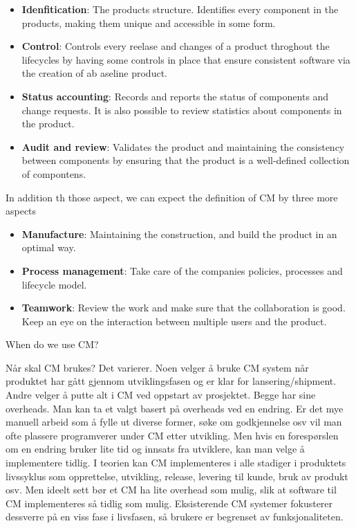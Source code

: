 \begin{itemize}

	\item \textbf{Idenfitication}: The products structure. Identifies every component in the products, making them unique and accessible in some form.
	\item \textbf{Control}: Controls every reelase and changes of a product throghout the lifecycles by having some controls in place that ensure consistent software via the creation of ab aseline product.
	\item \textbf{Status accounting}: Records and reports the status of components and change requests. It is also possible to review statistics about components in the product.
	\item \textbf{Audit and review}: Validates the product and maintaining the consistency between components by ensuring that the product is a well-defined collection of compontens.
\end{itemize}

In addition th those aspect, we can expect the definition of CM by three more aspects
\begin{itemize}
	\item \textbf{Manufacture}: Maintaining the construction, and build the product in an optimal way.
	\item \textbf{Process management}: Take care of the companies policies, processes and lifecycle model.
	\item \textbf{Teamwork}: Review the work and make sure that the collaboration is good. Keep an eye on the interaction between multiple users and the product.

\end{itemize}

When do we use CM? 



Når skal CM brukes? Det varierer. Noen velger å bruke CM system når produktet har gått gjennom utviklingsfasen og er klar for lansering/shipment. Andre velger å putte alt i CM ved oppstart av prosjektet. Begge har sine overheads. Man kan ta et valgt basert på overheads ved en endring. Er det mye manuell arbeid som å fylle ut diverse former, søke om godkjennelse osv vil man ofte plassere programverer under CM etter utvikling. Men hvis en forespørslen om en endring bruker lite tid og innsats fra utviklere, kan man velge å implementere tidlig. I teorien kan CM implementeres i alle stadiger i produktets livssyklus som opprettelse, utvikling, release, levering til kunde, bruk av produkt osv. Men ideelt sett bør et CM ha lite overhead som mulig, slik at software til CM implementeres så tidlig som mulig. Eksisterende CM systemer fokusterer dessverre på en viss fase i livsfasen, så brukere er begrenset av funksjonaliteten.



